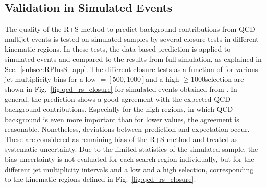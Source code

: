 \subsection{Validation in Simulated Events}
\label{subsec:validation_mc}
The quality of the R+S method to predict background contributions from QCD multijet events is tested on simulated samples by several closure tests in different kinematic regions. In these tests, the data-based prediction is applied to simulated events and compared to the results from full simulation, as explained in Sec.~\ref{subsec:RPlusS_app}. The different closure tests as a function of \MHT for various jet multiplicity bins for a low \HT $= [500, 1000]$\gev and a high \HT $\ge 1000$\gev selection are shown in Fig.~\ref{fig:qcd_rs_closure} for simulated events obtained from \madgraph. In general, the prediction shows a good agreement with the expected QCD background contributions. Especially for the high \HT regions, in which QCD background is even more important than for lower \HT values, the agreement is reasonable. Nonetheless, deviations between prediction and expectation occur. These are considered as remaining bias of the R+S method and treated as systematic uncertainty. Due to the limited statistics of the simulated sample, the bias uncertainty is not evaluated for each search region individually, but for the different jet multiplicity intervals and a low and a high \HT selection, corresponding to the kinematic regions defined in Fig.~\ref{fig:qcd_rs_closure}.
